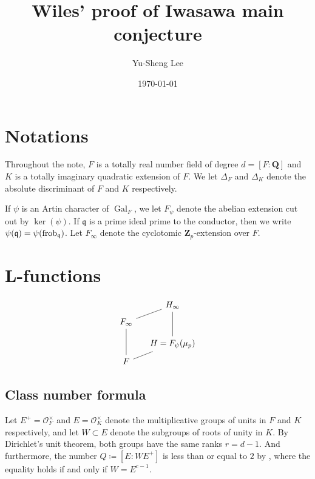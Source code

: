 \documentclass[leqno]{amsart}
\theoremstyle{definition}
\theoremstyle{remark}
\newcommand{\oo}{\mathcal{O}}
\newcommand{\Q}{{\mathbf{Q}}}
\newcommand{\Zp}{\mathbf{Z}_p}
\DeclareMathOperator{\Gal}{Gal}
\newcommand{\frob}{\textnormal{frob}} %
\newcommand{\fq}{\mathfrak{q}}
\newcommand{\F}{{{F}}} %
\newcommand{\K}{{{K}}} %
\begin{document}
\title{Wiles' proof of Iwasawa main conjecture}
\author[Y-S.~Lee]{Yu-Sheng Lee}
\address{Department of Mathematics, University  of Michigan, Ann Arbor, MI 48109, USA}
\date{\today}

\maketitle
\setcounter{tocdepth}{1}
\tableofcontents

\section{Notations}

Throughout the note, 
$\F$ is a totally real number field of degree $d=[\F:\Q]$ 
and $\K$ is a totally imaginary quadratic extension of $\F$.
We let $\Delta_\F$
and $\Delta_\K$ denote the absolute discriminant of $\F$ and $\K$ respectively.

If $\psi$ is an Artin character of $\Gal_\F$,
we let $\F_\psi$ denote the abelian extension cut out by 
$\ker(\psi)$. 
If $\fq$ is a prime ideal prime to the conductor,
then we write $\psi(\fq)=\psi(\frob_\fq)$.
Let $\F_\infty$ denote the cyclotomic  $\Zp$-extension over $\F$.




\section{L-functions}


\[
	\begin{tikzcd}[column sep=tiny,row sep=tiny]
        &  & H_\infty \\
	\F_\infty \arrow[rru,dash] & & \\
        &  & \\
        &  & H=\F_{\psi}(\mu_p) \arrow[uuu,dash] \\
	\F \arrow[uuu,dash] \arrow[rru,dash] & &                     
	\end{tikzcd}
\]

\subsection{Class number formula}

Let $E^+=\oo_\F^\times$ 
and $E=\oo_\K^\times$
denote the multiplicative groups of units in $\F$ and $\K$ respectively,
and let $W\subset E$ denote the subgroups of roots of unity in $\K$.
By Dirichlet's unit theorem,
both groups have the same ranks $r=d-1$.
And furthermore, the number $Q\coloneqq [E:WE^+]$ 
is less than or equal to $2$ by \cite[Thm 4.12]{Washington},
where the equality holds if and only if $W=E^{c-1}$.
\end{document}
